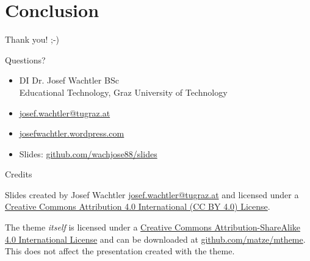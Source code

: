 \documentclass{beamer}
\begin{document}
\section{Conclusion}

\begin{frame}{Thank you! ;-)}
  
  \begin{center}
    \begin{huge}
      Questions?
    \end{huge}
  \end{center}
 
  \begin{itemize}
    \item DI Dr. Josef Wachtler BSc \\
    Educational Technology, Graz University of Technology
    \item \href{mailto:josef.wachtler@tugraz.at}{josef.wachtler@tugraz.at} 
    \item \href{https://josefwachtler.wordpress.com/}{josefwachtler.wordpress.com} 
    \item Slides: \href{https://github.com/wachjose88/slides}{github.com/wachjose88/slides}
  \end{itemize}
  

\end{frame}

\begin{frame}{Credits}

  Slides created by Josef Wachtler 
  \href{mailto:josef.wachtler@tugraz.at}{josef.wachtler@tugraz.at} 
  and licensed under a
  \href{http://creativecommons.org/licenses/by/4.0/}{Creative Commons
        Attribution 4.0 International (CC BY 4.0) License}. 
  
  \begin{center}
    \begin{huge}
      \ccby
    \end{huge}
  \end{center}

  \begin{tiny}
    The theme \emph{itself} is licensed under a
    \href{http://creativecommons.org/licenses/by-sa/4.0/}{Creative Commons
    Attribution-ShareAlike 4.0 International License}
    and can be downloaded at 
    \href{https://github.com/matze/mtheme}{github.com/matze/mtheme}.
    This does not affect the presentation created with the theme.
  \end{tiny}

\end{frame}

\end{document}
